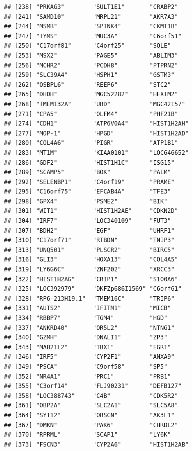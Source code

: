 \documentclass{article}\usepackage[]{graphicx}\usepackage[]{color}
\makeatletter
\newenvironment{kframe}{%
 \def\at@end@of@kframe{}%
 \ifinner\ifhmode%
  \def\at@end@of@kframe{\end{minipage}}%
  \begin{minipage}{\columnwidth}%
 \fi\fi%
 \def\FrameCommand##1{\hskip\@totalleftmargin \hskip-\fboxsep
 \colorbox{shadecolor}{##1}\hskip-\fboxsep
     \hskip-\linewidth \hskip-\@totalleftmargin \hskip\columnwidth}%
 \MakeFramed {\advance\hsize-\width
   \@totalleftmargin\z@ \linewidth\hsize
   \@setminipage}}%
 {\par\unskip\endMakeFramed%
 \at@end@of@kframe}
\newenvironment{knitrout}{}{} %
\makeatother
\begin{document}
\begin{knitrout}
\begin{kframe}
\begin{verbatim}
## [238] "PRKAG3"        "SULT1E1"       "CRABP2"       
## [241] "SAMD10"        "MRPL21"        "AKR7A3"       
## [244] "MSMB"          "SPINK4"        "CKMT1B"       
## [247] "TYMS"          "MUC3A"         "C6orf51"      
## [250] "C17orf81"      "C4orf25"       "SQLE"         
## [253] "MSX2"          "PAGE5"         "ABLIM3"       
## [256] "MCHR2"         "PCDH8"         "PTPRN2"       
## [259] "SLC39A4"       "HSPH1"         "GSTM3"        
## [262] "OSBPL6"        "REEP6"         "STC2"         
## [265] "DHDH"          "MGC52282"      "HEXIM2"       
## [268] "TMEM132A"      "UBD"           "MGC42157"     
## [271] "CPA5"          "OLFM4"         "PHF21B"       
## [274] "CDH1"          "ATP6V0A4"      "HIST1H2AH"    
## [277] "MOP-1"         "HPGD"          "HIST1H2AD"    
## [280] "COL4A6"        "PIGR"          "ATP1B1"       
## [283] "MT1M"          "KIAA0101"      "LOC646652"    
## [286] "GDF2"          "HIST1H1C"      "ISG15"        
## [289] "SCAMP5"        "BOK"           "PALM"         
## [292] "SELENBP1"      "C4orf19"       "PRAME"        
## [295] "C16orf75"      "EFCAB4A"       "TFE3"         
## [298] "GPX4"          "PSME2"         "BIK"          
## [301] "WIT1"          "HIST1H2AE"     "CDKN2D"       
## [304] "IRF7"          "LOC340109"     "FUT3"         
## [307] "BDH2"          "EGF"           "UHRF1"        
## [310] "C17orf71"      "RTBDN"         "TNIP3"        
## [313] "UNQ501"        "PLSCR2"        "BIRC5"        
## [316] "GLI3"          "HOXA13"        "COL4A5"       
## [319] "LY6G6C"        "ZNF202"        "XRCC3"        
## [322] "HIST1H2AG"     "CRIP1"         "S100A6"       
## [325] "LOC392979"     "DKFZp686I1569" "C6orf61"      
## [328] "RP6-213H19.1"  "TMEM16C"       "TRIP6"        
## [331] "AUTS2"         "IFITM1"        "MICB"         
## [334] "RBBP7"         "TGM4"          "HGD"          
## [337] "ANKRD40"       "OR5L2"         "NTNG1"        
## [340] "GZMH"          "DNALI1"        "ZP3"          
## [343] "MAB21L2"       "TBX1"          "EGR1"         
## [346] "IRF5"          "CYP2F1"        "ANXA9"        
## [349] "PSCA"          "C9orf58"       "SP5"          
## [352] "NR4A1"         "PRC1"          "PRB1"         
## [355] "C3orf14"       "FLJ90231"      "DEFB127"      
## [358] "LOC388743"     "C4B"           "CDK5R2"       
## [361] "OBP2A"         "SLC2A1"        "SLC5A8"       
## [364] "SYT12"         "OBSCN"         "AK3L1"        
## [367] "DMKN"          "PAK6"          "CHRDL2"       
## [370] "RPRML"         "SCAP1"         "LY6K"         
## [373] "FSCN3"         "CYP2A6"        "HIST1H2AB"    

\end{verbatim}
\end{kframe}
\end{knitrout}
\end{document}
